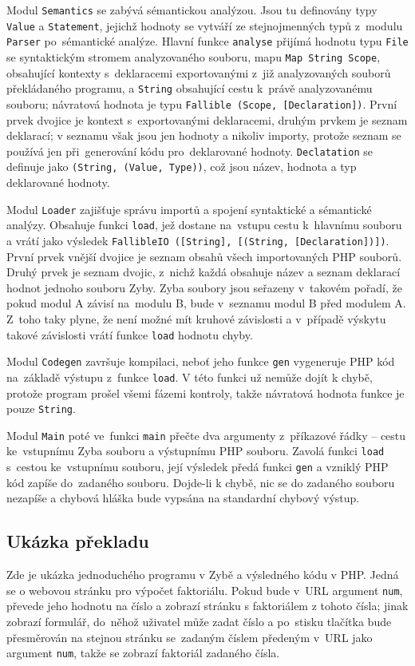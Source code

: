 \documentclass[a4paper,12pt]{article}
\begin{document}
Modul \texttt{Semantics} se zabývá sémantickou analýzou. Jsou tu definovány typy \texttt{Value} a \texttt{Statement}, jejichž hodnoty se vytváří ze stejnojmenných typů z~modulu \texttt{Parser} po~sémantické analýze. Hlavní funkce \texttt{analyse} přijímá hodnotu typu \texttt{File} se syntaktickým stromem analyzovaného souboru, mapu \texttt{Map String Scope}, obsahující kontexty s~deklaracemi exportovanými z~již analyzovaných souborů překládaného programu, a \texttt{String} obsahující cestu k~právě analyzovanému souboru; návratová hodnota je typu \texttt{Fallible (Scope, [Declaration])}. První prvek dvojice je kontext s~exportovanými deklaracemi, druhým prvkem je seznam deklarací; v seznamu však jsou jen hodnoty a nikoliv importy, protože seznam se používá jen při~generování kódu pro~deklarované hodnoty. \texttt{Declatation} se definuje jako \texttt{(String, (Value, Type))}, což jsou název, hodnota a typ deklarované hodnoty.

Modul \texttt{Loader} zajišťuje správu importů a spojení syntaktické a sémantické analýzy. Obsahuje funkci \texttt{load}, jež dostane na~vstupu cestu k~hlavnímu souboru a vrátí jako výsledek \texttt{FallibleIO ([String], [(String, [Declaration])])}. První prvek vnější dvojice je seznam obsahů všech importovaných PHP souborů. Druhý prvek je seznam dvojic, z~nichž každá obsahuje název a seznam deklarací hodnot jednoho souboru Zyby. Zyba soubory jsou seřazeny v~takovém pořadí, že pokud modul A závisí na~modulu B, bude v~seznamu modul B před modulem A. Z~toho taky plyne, že není možné mít kruhové závislosti a v~případě výskytu takové závislosti vrátí funkce \texttt{load} hodnotu chyby.

Modul \texttt{Codegen} završuje kompilaci, neboť jeho funkce \texttt{gen} vygeneruje PHP kód na~základě výstupu z~funkce \texttt{load}. V této funkci už nemůže dojít k chybě, protože program prošel všemi fázemi kontroly, takže návratová hodnota funkce je pouze \texttt{String}.

Modul \texttt{Main} poté ve~funkci \texttt{main} přečte dva argumenty z~příkazové řádky -- cestu ke~vstupnímu Zyba souboru a výstupnímu PHP souboru. Zavolá funkci \texttt{load} s~cestou ke~vstupnímu souboru, její výsledek předá funkci \texttt{gen} a vzniklý PHP kód zapíše do~zadaného souboru. Dojde-li k chybě, nic se do zadaného souboru nezapíše a chybová hláška bude vypsána na standardní chybový výstup.

\subsection{Ukázka překladu}
Zde je ukázka jednoduchého programu v Zybě a výsledného kódu v PHP. Jedná se o webovou stránku pro výpočet faktoriálu. Pokud bude v~URL argument \texttt{num}, převede jeho hodnotu na číslo a zobrazí stránku s faktoriálem z tohoto čísla; jinak zobrazí formulář, do~něhož uživatel může zadat číslo a po~stisku tlačítka bude přesměrován na stejnou stránku se~zadaným číslem předeným v~URL jako argument \texttt{num}, takže se zobrazí faktoriál zadaného čísla.
\end{document}
